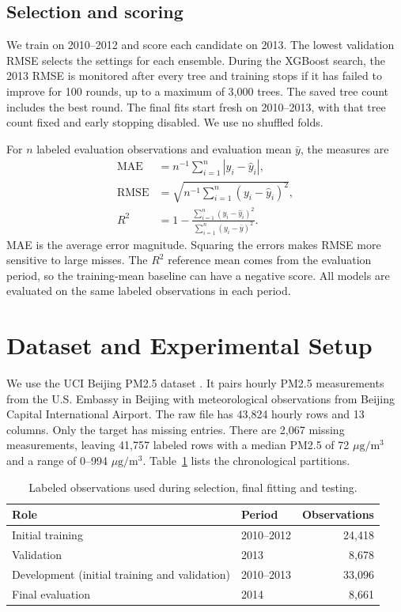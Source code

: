 \documentclass[11pt]{article}
\newcommand{\conc}{\ensuremath{\mu\mathrm{g}/\mathrm{m}^3}}
\begin{document}
\subsection{Selection and scoring}
We train on 2010--2012 and score each candidate on 2013. The lowest validation RMSE selects the settings for each ensemble. During the XGBoost search, the 2013 RMSE is monitored after every tree and training stops if it has failed to improve for 100 rounds, up to a maximum of 3,000 trees. The saved tree count includes the best round. The final fits start fresh on 2010--2013, with that tree count fixed and early stopping disabled. We use no shuffled folds.

For $n$ labeled evaluation observations and evaluation mean $\bar y$, the measures are
\begin{align}
\mathrm{MAE} &= n^{-1}\sum_{i=1}^{n}|y_i-\hat y_i|,\\
\mathrm{RMSE} &= \sqrt{n^{-1}\sum_{i=1}^{n}(y_i-\hat y_i)^2},\\
R^2 &= 1-\frac{\sum_{i=1}^{n}(y_i-\hat y_i)^2}{\sum_{i=1}^{n}(y_i-\bar y)^2}.
\end{align}
MAE is the average error magnitude. Squaring the errors makes RMSE more sensitive to large misses. The $R^2$ reference mean comes from the evaluation period, so the training-mean baseline can have a negative score. All models are evaluated on the same labeled observations in each period.

\section{Dataset and Experimental Setup}
We use the UCI Beijing PM2.5 dataset \citep{uci381}. It pairs hourly PM2.5 measurements from the U.S. Embassy in Beijing with meteorological observations from Beijing Capital International Airport. The raw file has 43,824 hourly rows and 13 columns. Only the target has missing entries. There are 2,067 missing measurements, leaving 41,757 labeled rows with a median PM2.5 of 72 \conc{} and a range of 0--994 \conc{}. Table~\ref{tab:splits} lists the chronological partitions.

\begin{table}[htbp]
\centering
\caption{Labeled observations used during selection, final fitting and testing.}
\label{tab:splits}
\begin{tabular}{llr}
\toprule
Role & Period & Observations \\
\midrule
Initial training & 2010--2012 & 24,418 \\
Validation & 2013 & 8,678 \\
Development (initial training and validation) & 2010--2013 & 33,096 \\
Final evaluation & 2014 & 8,661 \\
\bottomrule
\end{tabular}
\end{table}
\end{document}
